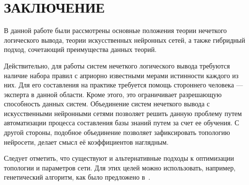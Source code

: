 \section*{ЗАКЛЮЧЕНИЕ}

В данной работе были рассмотрены основные положения теории нечеткого
логического вывода, теории искусственных нейронных сетей,
а также гибридный подход, сочетающий преимущества данных теорий.

Действительно, для работы систем нечеткого логического вывода
требуются наличие набора правил с априорно известными мерами истинности
каждого из них. Для его составления на практике требуется помощь
стороннего человека --- эксперта в данной области.
Кроме этого, это ограничивает разрешающую способность данных систем.
Объединение систем нечеткого вывода с искусственными нейронными
сетями позволяет решить данную проблему путем автоматизации
процесса составления базы знаний путем за счет ее обучения.
С другой стороны, подобное объединение позволяет зафиксировать
топологию нейросети, делает смысл её коэффициентов наглядным.

Следует отметить, что существуют и альтернативные подходы к оптимизации
топологии и параметров сети. Для этих целей можно использовать, например,
генетический алгоритм, как было предложено в~\cite{Tahmasebi201218}.
